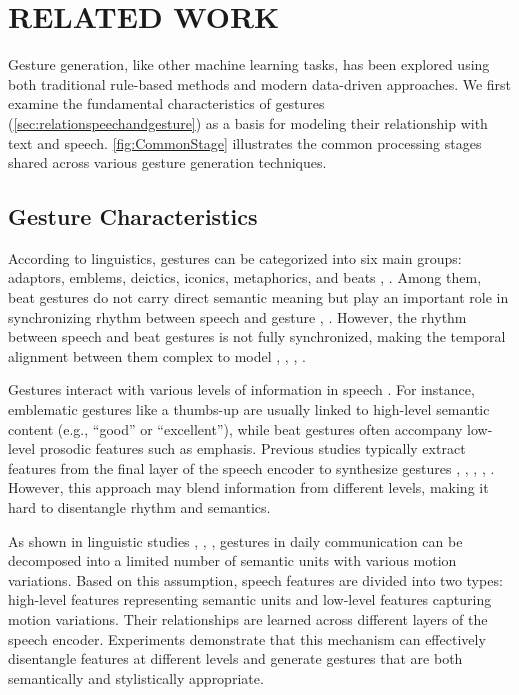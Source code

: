 \section{RELATED WORK}
\label{sec:related_work}


Gesture generation, like other machine learning tasks, has been explored using both traditional rule-based methods and modern data-driven approaches. We first examine the fundamental characteristics of gestures (\autoref{sec:relationspeechandgesture}) as a basis for modeling their relationship with text and speech. \autoref{fig:CommonStage} illustrates the common processing stages shared across various gesture generation techniques.


\subsection{Gesture Characteristics}
\label{sec:relationspeechandgesture}

According to linguistics, gestures can be categorized into six main groups: adaptors, emblems, deictics, iconics, metaphorics, and beats \cite{ekman1969repertoire}, \cite{sebeok2011advances}. Among them, beat gestures do not carry direct semantic meaning but play an important role in synchronizing rhythm between speech and gesture \cite{kipp2005gesture}, \cite{sebeok2011advances}. However, the rhythm between speech and beat gestures is not fully synchronized, making the temporal alignment between them complex to model \cite{mcclave1994gestural}, \cite{bhattacharya2021speech2affectivegestures}, \cite{kucherenko2020gesticulator}, \cite{yoon2020speech}.

Gestures interact with various levels of information in speech \cite{sebeok2011advances}. For instance, emblematic gestures like a thumbs-up are usually linked to high-level semantic content (e.g., “good” or “excellent”), while beat gestures often accompany low-level prosodic features such as emphasis. Previous studies typically extract features from the final layer of the speech encoder to synthesize gestures \cite{alexanderson2020style}, \cite{bhattacharya2021speech2affectivegestures}, \cite{kucherenko2021large}, \cite{qian2021speech}, \cite{yoon2022genea}. However, this approach may blend information from different levels, making it hard to disentangle rhythm and semantics.

As shown in linguistic studies \cite{kipp2005gesture}, \cite{neff2008gesture}, \cite{webb1997linguistic}, gestures in daily communication can be decomposed into a limited number of semantic units with various motion variations. Based on this assumption, speech features are divided into two types: high-level features representing semantic units and low-level features capturing motion variations. Their relationships are learned across different layers of the speech encoder. Experiments demonstrate that this mechanism can effectively disentangle features at different levels and generate gestures that are both semantically and stylistically appropriate.





